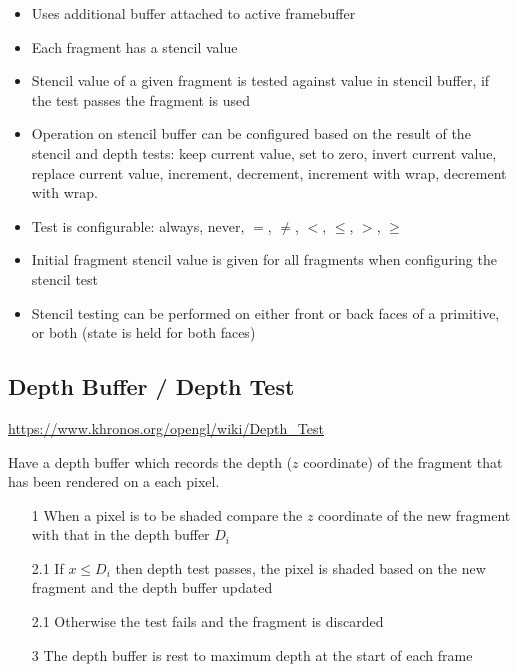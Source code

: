 \documentclass[a4paper]{article}
\begin{document}
\begin{itemize}
  \item
    Uses additional buffer attached to active framebuffer

  \item
    Each fragment has a stencil value

  \item
    Stencil value of a given fragment is tested against value in stencil buffer,
    if the test passes the fragment is used

  \item
    Operation on stencil buffer can be configured based on the result of the
    stencil and depth tests: keep current value, set to zero, invert current
    value, replace current value, increment, decrement, increment with wrap,
    decrement with wrap.

  \item
    Test is configurable: always, never, $=$, $\neq$, $<$, $\leq$, $>$, $\geq$

  \item
    Initial fragment stencil value is given for all fragments when configuring
    the stencil test

  \item
    Stencil testing can be performed on either front or back faces of a
    primitive, or both (state is held for both faces)

\end{itemize}

\subsection{Depth Buffer / Depth Test}

\url{https://www.khronos.org/opengl/wiki/Depth_Test}

Have a depth buffer which records the depth ($z$ coordinate) of the fragment
that has been rendered on a each pixel.

\begin{enumerate}
  \item[1]
    When a pixel is to be shaded compare the $z$ coordinate of the new fragment
    with that in the depth buffer $D_{i}$

  \item[2.1]
    If $x \leq D_{i}$ then depth test passes, the pixel is shaded based on the
    new fragment and the depth buffer updated

  \item[2.1]
    Otherwise the test fails and the fragment is discarded

  \item[3]
    The depth buffer is rest to maximum depth at the start of each frame

\end{enumerate}
\end{document}
